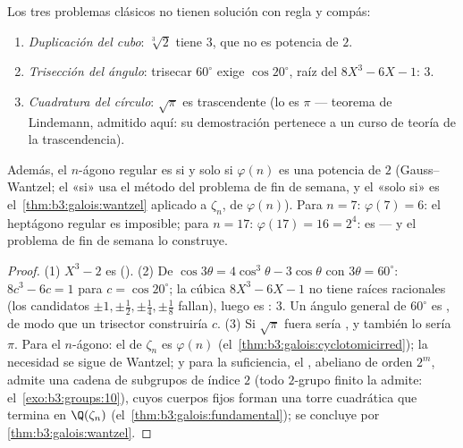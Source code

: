 \begin{corollary}\label{cor:b3:galois:impossible}
Los tres problemas clásicos no tienen solución con regla y
compás:
\begin{enumerate}
  \item \emph{Duplicación del cubo}: $\sqrt[3]2$ tiene
   $3$, que no es potencia de
  $2$. \item \emph{Trisección del ángulo}: trisecar $60^\circ$ exige
  $\cos 20^\circ$, raíz del
   $8X^3
        - 6X - 1$:  $3$. \item
  \emph{Cuadratura del círculo}: $\sqrt\pi$ es trascendente (lo es $\pi$
  --- teorema de Lindemann, admitido aquí: su demostración pertenece a
  un curso de teoría de la trascendencia).
\end{enumerate}
Además, el $n$-ágono regular es
 si y solo si
$\varphi(n)$ es una potencia de $2$ (Gauss--Wantzel; el «si» usa el
método del problema de fin de semana, y el «solo si» es
el~\cref{thm:b3:galois:wantzel} aplicado a $\zeta_n$, de
 $\varphi(n)$). Para $n = 7$:
$\varphi(7) = 6$: el heptágono regular es imposible; para $n = 17$:
$\varphi(17) = 16 = 2^4$: es
 --- y el problema de
fin de semana lo construye.
\end{corollary}

\begin{proof}
(1) $X^3 - 2$ es 
(). (2) De $\cos
3\theta = 4\cos^3\theta - 3\cos\theta$ con $3\theta =
60^\circ$: $8c^3 - 6c = 1$ para $c = \cos 20^\circ$; la cúbica
$8X^3 - 6X - 1$ no tiene raíces racionales (los candidatos
$\pm1, \pm\frac
12, \pm\frac14, \pm\frac18$ fallan), luego es
:
 $3$. Un ángulo general de
$60^\circ$ es , de modo
que un trisector construiría $c$. (3) Si $\sqrt\pi$ fuera
 sería
, y también lo sería $\pi$.
Para el $n$-ágono: el  de
$\zeta_n$ es $\varphi(n)$ (el~\cref{thm:b3:galois:cyclotomicirred}); la
necesidad se sigue de Wantzel; y para la suficiencia, el
, abeliano de orden $2^m$,
admite una cadena de subgrupos de índice $2$ (todo $2$-grupo finito la
admite: el~\cref{exo:b3:groups:10}), cuyos cuerpos fijos forman una
torre cuadrática que termina en $\Q(\zeta_n)$
(el~\cref{thm:b3:galois:fundamental}); se concluye por
\cref{thm:b3:galois:wantzel}.
\end{proof}

